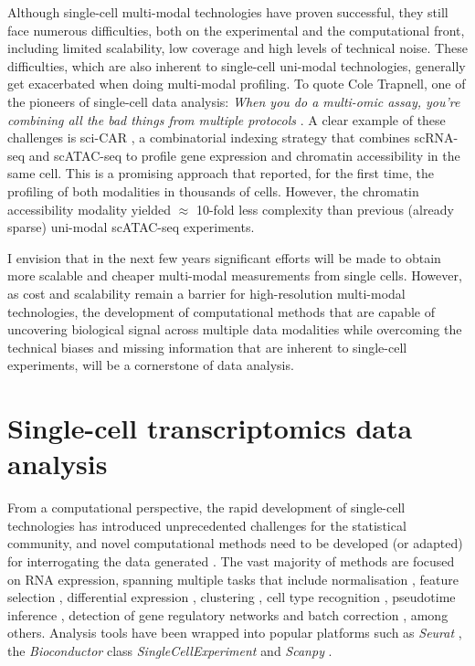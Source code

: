 Although single-cell multi-modal technologies have proven successful, they still face numerous difficulties, both on the experimental and the computational front, including limited scalability, low coverage and high levels of technical noise. These difficulties, which are also inherent to single-cell uni-modal technologies, generally get exacerbated when doing multi-modal profiling. To quote Cole Trapnell, one of the pioneers of single-cell data analysis: \textit{When you do a multi-omic assay, you're combining all the bad things from multiple protocols} \cite{Eisenstein2020}. A clear example of these challenges is sci-CAR \cite{Cao2018a}, a combinatorial indexing strategy that combines scRNA-seq and scATAC-seq to profile gene expression and chromatin accessibility in the same cell. This is a promising approach that reported, for the first time, the profiling of both modalities in thousands of cells. However, the  chromatin accessibility modality yielded $\approx$ 10-fold less complexity than previous (already sparse) uni-modal scATAC-seq experiments.

I envision that in the next few years significant efforts will be made to obtain more scalable and cheaper multi-modal measurements from single cells. However, as cost and scalability remain a barrier for high-resolution multi-modal technologies, the development of computational methods that are capable of uncovering biological signal across multiple data modalities while overcoming the technical biases and missing information that are inherent to single-cell experiments, will be a cornerstone of data analysis.


\section{Single-cell transcriptomics data analysis}

From a computational perspective, the rapid development of single-cell technologies has introduced unprecedented challenges for the statistical community, and novel computational methods need to be developed (or adapted) for interrogating the data generated \cite{Stegle2015}. The vast majority of methods are focused on RNA expression, spanning multiple tasks that include normalisation \cite{Lun2016a}, feature selection \cite{Townes2019}, differential expression \cite{Kharchenko2014}, clustering \cite{Kiselev2017}, cell type recognition \cite{Abdelaal2019}, pseudotime inference \cite{Haghverdi2016}, detection of gene regulatory networks \cite{Aibar2017} and batch correction \cite{Haghverdi2018}, among others. Analysis tools have been wrapped into popular platforms such as \textit{Seurat} \cite{Butler2018}, the \textit{Bioconductor} class \textit{SingleCellExperiment} \cite{Amezquita2020} and \textit{Scanpy} \cite{Wolf2018}.

